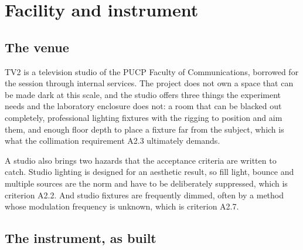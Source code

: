 \chapter{Facility and instrument}
\label{chap:setup}

\section{The venue}

TV2 is a television studio of the PUCP Faculty of Communications, borrowed for
the session through internal services. The project does not own a space that
can be made dark at this scale, and the studio offers three things the
experiment needs and the laboratory enclosure does not: a room that can be
blacked out completely, professional lighting fixtures with the rigging to
position and aim them, and enough floor depth to place a fixture far from the
subject, which is what the collimation requirement A2.3 ultimately demands.

A studio also brings two hazards that the acceptance criteria are written to
catch. Studio lighting is designed for an aesthetic result, so fill light,
bounce and multiple sources are the norm and have to be deliberately
suppressed, which is criterion A2.2. And studio fixtures are frequently
dimmed, often by a method whose modulation frequency is unknown, which is
criterion A2.7.

\section{The instrument, as built}

